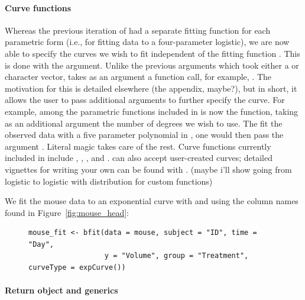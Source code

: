 \paragraph{Curve functions} Whereas the previous iteration of  had a separate fitting function for each parametric form (i.e.,  for fitting data to a four-parameter logistic), we are now able to specify the curves we wish to fit independent of the fitting function . This is done with the  argument. Unlike the previous arguments which took either a  or character  vector,  takes as an argument a function call, for example, . The motivation for this is detailed elsewhere (the appendix, maybe?), but in short, it allows the user to pass additional arguments to further specify the curve. For example, among the parametric functions included in  is now the  function, taking as an additional argument the number of degrees we wish to use. The fit the observed data with a five parameter polynomial in , one would then pass the argument . Literal magic takes care of the rest. Curve functions currently included in  include , , , and .  can also accept user-created curves; detailed vignettes for writing your own can be found with . (maybe i'll show going from logistic to logistic with distribution for custom functions)

We fit the mouse data to an exponential curve with  and using the column names found in Figure~\ref{fig:mouse_head}:

\begin{singlespace}
\begin{figure}[H]
\centering
\begin{BVerbatim}
mouse_fit <- bfit(data = mouse, subject = "ID", time = "Day", 
                  y = "Volume", group = "Treatment", curveType = expCurve())
\end{BVerbatim}
\label{fig:bfit_example}
\end{figure}
\end{singlespace}


\paragraph{Return object and generics}


